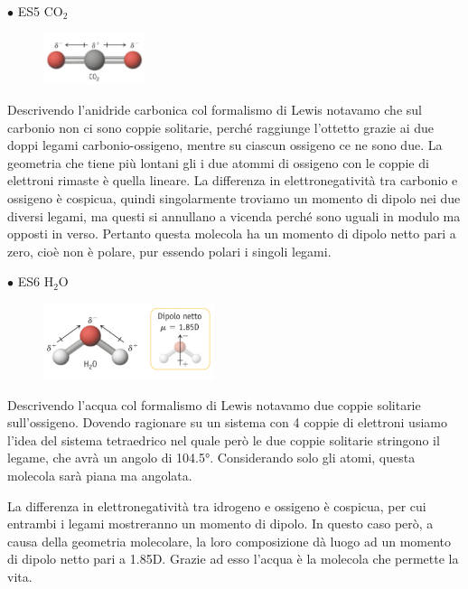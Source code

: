 \vspace{0.2cm}$\bullet$ ES5 CO$_2$

\begin{figure}[htp]
    \centering
    \includegraphics[width=3cm]{immagini/CO_2.png}
\end{figure}

\vspace{-0.4cm}Descrivendo l'anidride carbonica col formalismo di Lewis notavamo che sul carbonio non ci sono coppie solitarie, perché raggiunge l'ottetto grazie ai due doppi legami carbonio-ossigeno, mentre su ciascun ossigeno ce ne sono due. La geometria che tiene più lontani gli i due atommi di ossigeno con le coppie di elettroni rimaste è quella lineare.
La differenza in elettronegatività tra carbonio e ossigeno è cospicua, quindi singolarmente troviamo un momento di dipolo nei due diversi legami, ma questi si annullano a vicenda perché sono uguali in modulo ma opposti in verso. Pertanto questa molecola ha un momento di dipolo netto pari a zero, cioè non è polare, pur essendo polari i singoli legami.

\vspace{0.2cm}$\bullet$ ES6 H$_2$O

\begin{figure}[htp]
    \centering
    \includegraphics[width=5cm]{immagini/H_2O.png}
\end{figure}

\vspace{-0.4cm}Descrivendo l'acqua col formalismo di Lewis notavamo due coppie solitarie sull'ossigeno. Dovendo ragionare su un sistema con 4 coppie di elettroni usiamo l'idea del sistema tetraedrico nel quale però le due coppie solitarie stringono il legame, che avrà un angolo di 104.5°. Considerando solo gli atomi, questa molecola sarà piana ma angolata.

La differenza in elettronegatività tra idrogeno e ossigeno è cospicua, per cui entrambi i legami mostreranno un momento di dipolo. In questo caso però, a causa della geometria molecolare, la loro composizione dà luogo ad un momento di dipolo netto pari a 1.85D. Grazie ad esso l'acqua è la molecola che permette la vita.

